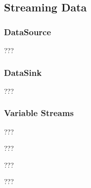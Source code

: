 \subsection{Streaming Data}

\subsubsection{DataSource}
???

\subsubsection{DataSink}
???

\subsubsection{Variable Streams}
???

???

???

???
